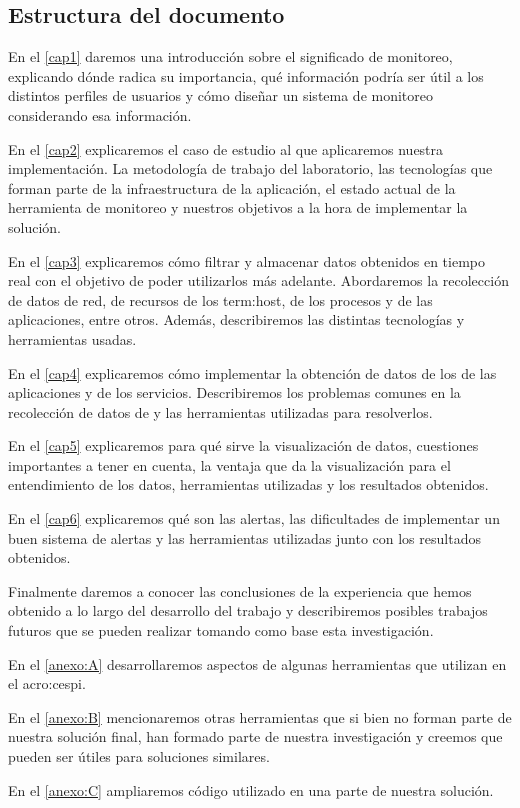 \subsection{Estructura del documento}
\label{estructura}

En el \autoref{cap1} daremos una introducción sobre el significado de
monitoreo, explicando dónde radica su importancia, qué información podría ser
útil a los distintos perfiles de usuarios y cómo diseñar un sistema de
monitoreo considerando esa información.

En el \autoref{cap2} explicaremos el caso de estudio al que aplicaremos nuestra
implementación. La metodología de trabajo del laboratorio, las tecnologías que
forman parte de la infraestructura de la aplicación, el estado actual de la
herramienta de monitoreo y nuestros objetivos a la hora de implementar la
solución.

En el \autoref{cap3} explicaremos cómo filtrar y almacenar datos obtenidos en
tiempo real con el objetivo de poder utilizarlos más adelante. Abordaremos la
recolección de datos de red, de recursos de los \gls{term:host}, de los
procesos y de las aplicaciones, entre otros. Además, describiremos las
distintas tecnologías y herramientas usadas.

En el \autoref{cap4} explicaremos cómo implementar la obtención de datos de los
 de las aplicaciones y de los servicios. Describiremos los problemas
comunes en la recolección de datos de  y las herramientas utilizadas
para resolverlos.

En el \autoref{cap5} explicaremos para qué sirve la visualización de datos,
cuestiones importantes a tener en cuenta, la ventaja que da la visualización
para el entendimiento de los datos, herramientas utilizadas y los resultados
obtenidos.

En el \autoref{cap6} explicaremos qué son las alertas, las dificultades de
implementar un buen sistema de alertas y las herramientas utilizadas junto con
los resultados obtenidos.

Finalmente daremos a conocer las conclusiones de la experiencia que hemos
obtenido a lo largo del desarrollo del trabajo y describiremos posibles
trabajos futuros que se pueden realizar tomando como base esta investigación.

En el \autoref{anexo:A} desarrollaremos aspectos de algunas herramientas que
utilizan en el \gls{acro:cespi}.

En el \autoref{anexo:B} mencionaremos otras herramientas que si bien no forman
parte de nuestra solución final, han formado parte de nuestra investigación y
creemos que pueden ser útiles para soluciones similares.

En el \autoref{anexo:C} ampliaremos código utilizado en una parte de nuestra
solución.
